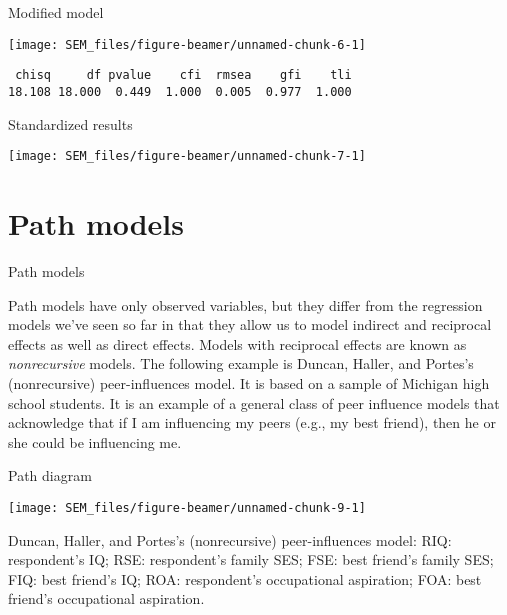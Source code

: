 \documentclass[10pt,ignorenonframetext,]{beamer}
\begin{document}
\begin{frame}[fragile]{Modified model}

\begin{center}\texttt{[image: SEM\_files/figure-beamer/unnamed-chunk-6-1]} \end{center}

\begin{verbatim}
 chisq     df pvalue    cfi  rmsea    gfi    tli 
18.108 18.000  0.449  1.000  0.005  0.977  1.000 
\end{verbatim}

\end{frame}

\begin{frame}{Standardized results}

\begin{center}\texttt{[image: SEM\_files/figure-beamer/unnamed-chunk-7-1]} \end{center}

\end{frame}

\section{Path models}\label{path-models}

\begin{frame}{Path models}

Path models have only observed variables, but they differ from the
regression models we've seen so far in that they allow us to model
indirect and reciprocal effects as well as direct effects. Models with
reciprocal effects are known as \emph{nonrecursive} models. The
following example is Duncan, Haller, and Portes's (nonrecursive)
peer-influences model. It is based on a sample of Michigan high school
students. It is an example of a general class of peer influence models
that acknowledge that if I am influencing my peers (e.g., my best
friend), then he or she could be influencing me.

\end{frame}

\begin{frame}{Path diagram}

\begin{center}\texttt{[image: SEM\_files/figure-beamer/unnamed-chunk-9-1]} \end{center}

\scriptsize
Duncan, Haller, and Portes's (nonrecursive) peer-influences model: RIQ:
respondent's IQ; RSE: respondent's family SES; FSE: best friend's family
SES; FIQ: best friend's IQ; ROA: respondent's occupational aspiration;
FOA: best friend's occupational aspiration.

\end{frame}
\end{document}
